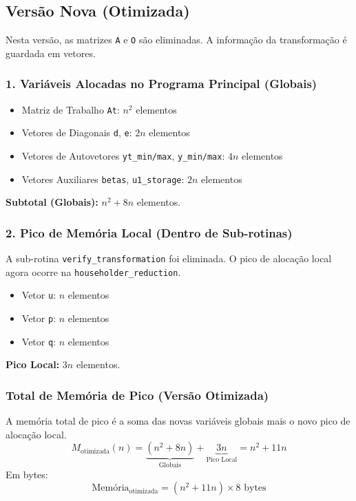 \documentclass[12pt, a4paper]{article} %
\begin{document}
            \subsection*{Vers\~ao Nova (Otimizada)}

            Nesta vers\~ao, as matrizes \texttt{A} e \texttt{O} s\~ao eliminadas. A informa\c{c}\~ao da transforma\c{c}\~ao \'e guardada em vetores.

            \subsubsection*{1. Vari\'aveis Alocadas no Programa Principal (Globais)}
            \begin{itemize}
                \item Matriz de Trabalho \texttt{At}: $n^2$ elementos
                \item Vetores de Diagonais \texttt{d}, \texttt{e}: $2n$ elementos
                \item Vetores de Autovetores \texttt{yt\_min/max}, \texttt{y\_min/max}: $4n$ elementos
                \item Vetores Auxiliares \texttt{betas}, \texttt{u1\_storage}: $2n$ elementos
            \end{itemize}
            \textbf{Subtotal (Globais):} $n^2 + 8n$ elementos.

            \subsubsection*{2. Pico de Mem\'oria Local (Dentro de Sub-rotinas)}
            A sub-rotina \texttt{verify\_transformation} foi eliminada. O pico de aloca\c{c}\~ao local agora ocorre na \texttt{householder\_reduction}.
            \begin{itemize}
                \item Vetor \texttt{u}: $n$ elementos
                \item Vetor \texttt{p}: $n$ elementos
                \item Vetor \texttt{q}: $n$ elementos
            \end{itemize}
            \textbf{Pico Local:} $3n$ elementos.

            \subsubsection*{Total de Mem\'oria de Pico (Vers\~ao Otimizada)}
            A mem\'oria total de pico \'e a soma das novas vari\'aveis globais mais o novo pico de aloca\c{c}\~ao local.
            \[
            M_{\text{otimizada}}(n) = \underbrace{(n^2 + 8n)}_{\text{Globais}} + \underbrace{3n}_{\text{Pico Local}} = n^2 + 11n
            \]
            Em bytes:
            \[
            \text{Mem\'oria}_{\text{otimizada}} = (n^2 + 11n) \times 8 \text{ bytes}
            \]
\end{document}
